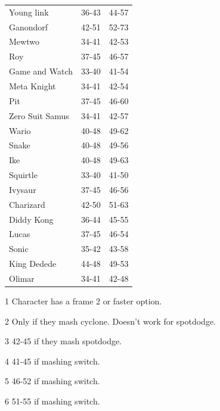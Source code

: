 \begin{table}[h]
\begin{subtable}[t]{.45\linewidth}
\begin{tabular}{lcc}
            Young link        & 36-43          & 44-57 \\
            Ganondorf         & 42-51          & 52-73 \\
            Mewtwo            & 34-41          & 42-53 \\
            Roy               & 37-45          & 46-57 \\
            Game and Watch    & 33-40          & 41-54 \\
            Meta Knight       & 34-41          & 42-54 \\
            Pit               & 37-45          & 46-60 \\
            Zero Suit Samus   & 34-41          & 42-57 \\
            Wario             & 40-48          & 49-62 \\
            Snake             & 40-48          & 49-56 \\
            Ike               & 40-48          & 49-63 \\
            Squirtle          & 33-40\tnote{1} & 41-50\tnote{4} \\
            Ivysaur           & 37-45\tnote{1} & 46-56\tnote{5} \\
            Charizard         & 42-50\tnote{1} & 51-63\tnote{6} \\
            Diddy Kong        & 36-44          & 45-55 \\
            Lucas             & 37-45\tnote{1} & 46-54 \\
            Sonic             & 35-42          & 43-58 \\
            King Dedede       & 44-48          & 49-53 \\
            Olimar            & 34-41          & 42-48 \\
            \bottomrule
        \end{tabular}
        \begin{tablenotes}
            \item[1] Character has a frame 2 or faster option.
            \item[2] Only if they mash cyclone. Doesn't work for spotdodge.
            \item[3] 42-45 if they mash spotdodge.
            \item[4] 41-45 if mashing switch.
            \item[5] 46-52 if mashing switch.
            \item[6] 51-55 if mashing switch.

\end{tablenotes}
\end{subtable}
\end{table}
